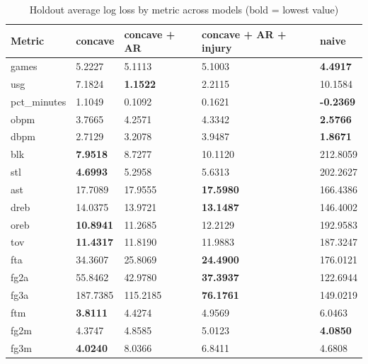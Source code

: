 \begin{table}
\caption{Holdout average log loss by metric across models (bold = lowest value)}
\label{tab:holdout_log_loss_all_models}
\begin{tabular}{lllll}
\toprule
Metric & concave & concave + AR & concave + AR + injury & naive \\
\midrule
games & 5.2227 & 5.1113 & 5.1003 & \textbf{4.4917} \\
usg & 7.1824 & \textbf{1.1522} & 2.2115 & 10.1584 \\
pct_minutes & 1.1049 & 0.1092 & 0.1621 & \textbf{-0.2369} \\
obpm & 3.7665 & 4.2571 & 4.3342 & \textbf{2.5766} \\
dbpm & 2.7129 & 3.2078 & 3.9487 & \textbf{1.8671} \\
blk & \textbf{7.9518} & 8.7277 & 10.1120 & 212.8059 \\
stl & \textbf{4.6993} & 5.2958 & 5.6313 & 202.2627 \\
ast & 17.7089 & 17.9555 & \textbf{17.5980} & 166.4386 \\
dreb & 14.0375 & 13.9721 & \textbf{13.1487} & 146.4002 \\
oreb & \textbf{10.8941} & 11.2685 & 12.2129 & 192.9583 \\
tov & \textbf{11.4317} & 11.8190 & 11.9883 & 187.3247 \\
fta & 34.3607 & 25.8069 & \textbf{24.4900} & 176.0121 \\
fg2a & 55.8462 & 42.9780 & \textbf{37.3937} & 122.6944 \\
fg3a & 187.7385 & 115.2185 & \textbf{76.1761} & 149.0219 \\
ftm & \textbf{3.8111} & 4.4274 & 4.9569 & 6.0463 \\
fg2m & 4.3747 & 4.8585 & 5.0123 & \textbf{4.0850} \\
fg3m & \textbf{4.0240} & 8.0366 & 6.8411 & 4.6808 \\
\bottomrule
\end{tabular}
\end{table}
